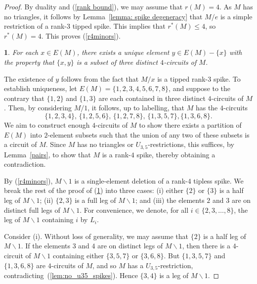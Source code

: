 \documentclass[11pt]{amsart}
\newtheorem{sublemma}{}[theorem]
\numberwithin{equation}{section} %
\begin{document}
\begin{proof}
By duality and (\ref{rank bound}), we may assume that $r(M)=4$. As $M$ has no triangles, it follows by Lemma~\ref{lemma: spike degeneracy} that $M/e$ is a simple restriction of a rank-$3$ tipped spike. This implies that $r^*(M) \leq 4$, so $r^*(M)=4$. This proves (\ref{r4minors}).

\begin{sublemma}
\label{cor:buddy_lemma}
For each $x\in E(M)$, there exists a unique element $y\in E(M)-\{x\}$ with the property that $\{x, y\}$ is a subset of three distinct $4$-circuits of $M$.
\end{sublemma}

The existence of $y$ follows from the fact that $M/x$ is a tipped rank-$3$ spike. To establish uniqueness, let $E(M)=\{1, 2, 3, 4, 5, 6, 7, 8\}$, and suppose to the contrary that $\{1, 2\}$ and $\{1, 3\}$ are each contained in three distinct $4$-circuits of $M$. Then, by considering $M/1$, it follows, up to labelling, that $M$ has the $4$-circuits
$$\{1, 2, 3, 4\},\, \{1, 2, 5, 6\},\, \{1, 2, 7, 8\},\, \{1, 3, 5, 7\}, \{1, 3, 6, 8\}.$$
We aim to construct enough $4$-circuits of $M$ to show there exists a partition of $E(M)$ into $2$-element subsets such that the union of any two of these subsets is a circuit of $M$. Since $M$ has no triangles or $U_{3,5}$-restrictions, this suffices, by Lemma~\ref{pairs}, to show that $M$ is a rank-$4$ spike, thereby obtaining a contradiction.

By (\ref{r4minors}), $M\backslash 1$ is a single-element deletion of a rank-$4$ tipless spike. We break the rest of the proof of (\ref{cor:buddy_lemma}) into three cases: (i) either $\{2\}$ or $\{3\}$ is a half leg of $M\backslash 1$; (ii) $\{2, 3\}$ is a full leg of $M\backslash 1$; and (iii) the elements $2$ and $3$ are on distinct full legs of $M\backslash 1$. For convenience, we denote, for all $i\in\{2, 3, \ldots, 8\}$, the leg of $M\backslash 1$ containing $i$ by $L_i$.

Consider (i). Without loss of generality, we may assume that $\{2\}$ is a half leg of $M\backslash 1$. If the elements $3$ and $4$ are on distinct legs of $M\backslash 1$, then there is a $4$-circuit of $M\backslash 1$ containing either $\{3, 5, 7\}$ or $\{3, 6, 8\}$. But $\{1, 3, 5, 7\}$ and $\{1, 3, 6, 8\}$ are $4$-circuits of $M$, and so $M$ has a $U_{3, 5}$-restriction, contradicting~(\ref{lem:no_u35_spikes}). Hence $\{3, 4\}$ is a leg of $M\backslash 1$.


\end{proof}
\end{document}
